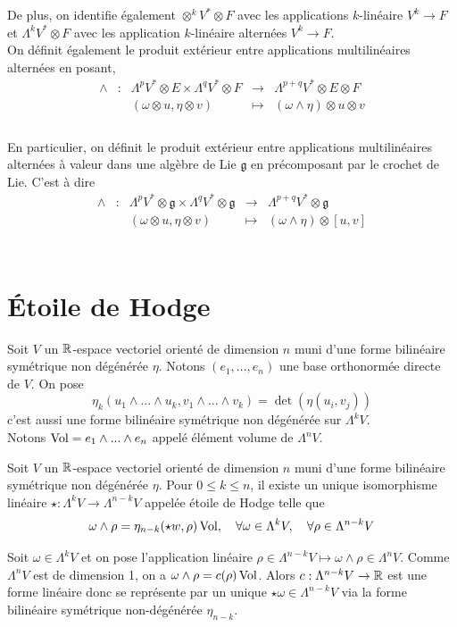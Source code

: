 \documentclass[12pt, a4paper]{book}
\begin{document}
De plus, on identifie également $\otimes^k V^* \otimes F$ avec les applications $k$-linéaire $V^k \to F$ et $\Lambda^k V^* \otimes F$ avec les application $k$-linéaire alternées $V^k \to F$. \\

On définit également le produit extérieur entre applications multilinéaires alternées en posant, 
$$\begin{array}{ccccc}
	\wedge & : & \Lambda^p V^* \otimes E \times \Lambda^q V^* \otimes F & \to & \Lambda^{p+q} V^* \otimes E \otimes F \\
		& & (\omega \otimes u, \eta \otimes v) & \mapsto & (\omega \wedge \eta) \otimes u \otimes v \\
\end{array}$$ \\

En particulier, on définit le produit extérieur entre applications multilinéaires alternées à valeur dans une algèbre de Lie $\mathfrak{g}$ en précomposant par le crochet de Lie. C'est à dire
$$\begin{array}{ccccc}
	\wedge & : & \Lambda^p V^* \otimes \mathfrak{g} \times \Lambda^q V^* \otimes \mathfrak{g} & \to & \Lambda^{p+q} V^* \otimes \mathfrak{g} \\
		& & (\omega \otimes u, \eta \otimes v) & \mapsto & (\omega \wedge \eta) \otimes [u, v] \\
\end{array}$$ \\

\section{Étoile de Hodge}

Soit $V$ un $\mathbb{R}$-espace vectoriel orienté de dimension $n$ muni d'une forme bilinéaire symétrique non dégénérée $\eta$. Notons $(e_1, ..., e_n)$ une base orthonormée directe de $V$. On pose 
$$\eta_k(u_1 \wedge ... \wedge u_k, v_1 \wedge ... \wedge v_k) = \det (\eta(u_i, v_j))$$
c'est aussi une forme bilinéaire symétrique non dégénérée sur $\Lambda^k V$.\\
Notons $\operatorname{Vol} = e_1 \wedge ... \wedge e_n$ appelé élément volume de $\Lambda^n V$. 

\begin{defi}
Soit $V$ un $\mathbb{R}$-espace vectoriel orienté de dimension $n$ muni d'une forme bilinéaire symétrique non dégénérée $\eta$. Pour $0 \leq k \leq n$, il existe un unique isomorphisme linéaire $\star : \Lambda^k V \to \Lambda^{n-k} V$ appelée étoile de Hodge telle que 
$$\omega \wedge \rho = \eta_{n-k}(\star w, \rho) \operatorname{Vol}, \quad \forall \omega \in \Lambda^k V, \quad \forall \rho \in \Lambda^{n-k} V$$
\end{defi} 
\begin{preu}
Soit $\omega \in \Lambda^k V$ et on pose l'application linéaire $\rho \in \Lambda^{n-k} V \mapsto \omega \wedge \rho \in \Lambda^n V$. Comme $\Lambda^n V$ est de dimension 1, on a $\omega \wedge \rho = c(\rho)\operatorname{Vol}$. Alors $c : \Lambda^{n-k} V \to \mathbb{R}$ est une forme linéaire donc se représente par un unique $\star\omega \in \Lambda^{n-k} V$ via la forme bilinéaire symétrique non-dégénérée $\eta_{n-k}$.
\end{preu}
\end{document}
